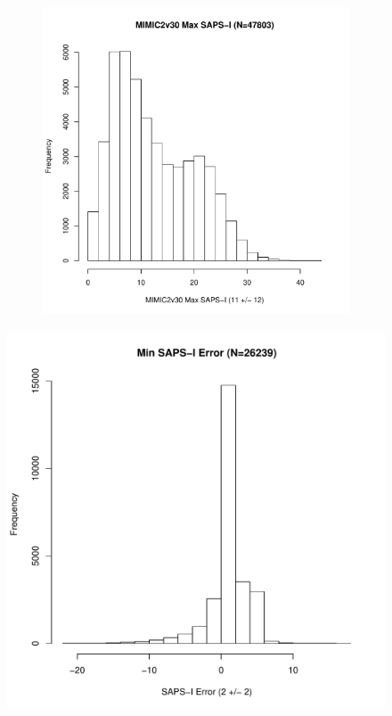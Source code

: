 \documentclass[10pt]{article}
\begin{document}
\begin{figure}
\begin{subfigure}[b]{0.5\textwidth}
                \includegraphics[width=\linewidth]{../../figure/fig_hist_sapsi_max_mimic2v30.pdf}   
        \end{subfigure}
\end{figure}


\begin{figure}
\includegraphics[width=0.45\linewidth]{../../figure/fig_hist_sapsi_min_err.pdf}
\end{figure}
\end{document}
